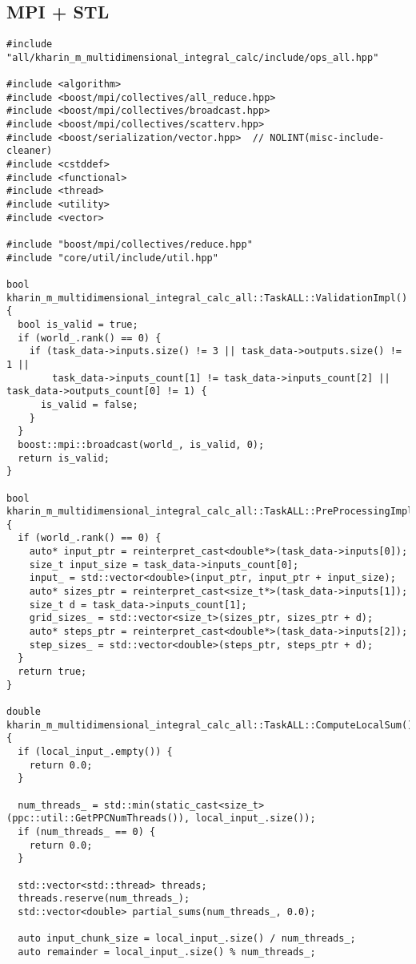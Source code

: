 \documentclass[12pt]{article}
\begin{document}
\subsection*{MPI + STL}
\begin{lstlisting}
#include "all/kharin_m_multidimensional_integral_calc/include/ops_all.hpp"

#include <algorithm>
#include <boost/mpi/collectives/all_reduce.hpp>
#include <boost/mpi/collectives/broadcast.hpp>
#include <boost/mpi/collectives/scatterv.hpp>
#include <boost/serialization/vector.hpp>  // NOLINT(misc-include-cleaner)
#include <cstddef>
#include <functional>
#include <thread>
#include <utility>
#include <vector>

#include "boost/mpi/collectives/reduce.hpp"
#include "core/util/include/util.hpp"

bool kharin_m_multidimensional_integral_calc_all::TaskALL::ValidationImpl() {
  bool is_valid = true;
  if (world_.rank() == 0) {
    if (task_data->inputs.size() != 3 || task_data->outputs.size() != 1 ||
        task_data->inputs_count[1] != task_data->inputs_count[2] || task_data->outputs_count[0] != 1) {
      is_valid = false;
    }
  }
  boost::mpi::broadcast(world_, is_valid, 0);
  return is_valid;
}

bool kharin_m_multidimensional_integral_calc_all::TaskALL::PreProcessingImpl() {
  if (world_.rank() == 0) {
    auto* input_ptr = reinterpret_cast<double*>(task_data->inputs[0]);
    size_t input_size = task_data->inputs_count[0];
    input_ = std::vector<double>(input_ptr, input_ptr + input_size);
    auto* sizes_ptr = reinterpret_cast<size_t*>(task_data->inputs[1]);
    size_t d = task_data->inputs_count[1];
    grid_sizes_ = std::vector<size_t>(sizes_ptr, sizes_ptr + d);
    auto* steps_ptr = reinterpret_cast<double*>(task_data->inputs[2]);
    step_sizes_ = std::vector<double>(steps_ptr, steps_ptr + d);
  }
  return true;
}

double kharin_m_multidimensional_integral_calc_all::TaskALL::ComputeLocalSum() {
  if (local_input_.empty()) {
    return 0.0;
  }

  num_threads_ = std::min(static_cast<size_t>(ppc::util::GetPPCNumThreads()), local_input_.size());
  if (num_threads_ == 0) {
    return 0.0;
  }

  std::vector<std::thread> threads;
  threads.reserve(num_threads_);
  std::vector<double> partial_sums(num_threads_, 0.0);

  auto input_chunk_size = local_input_.size() / num_threads_;
  auto remainder = local_input_.size() % num_threads_;


\end{lstlisting}
\end{document}
